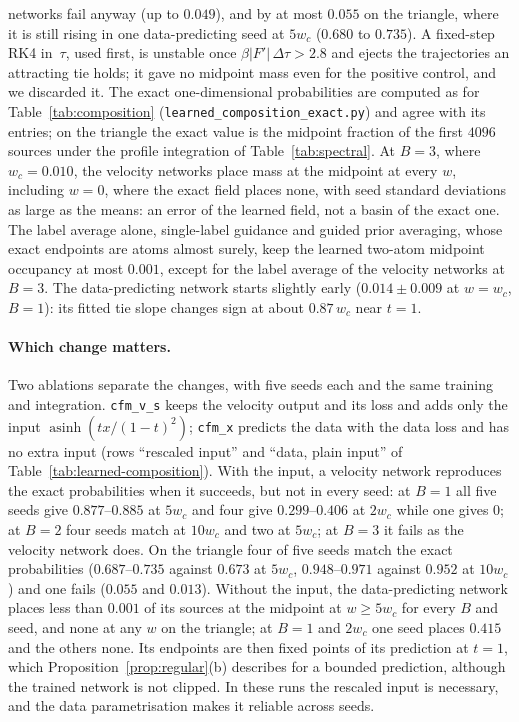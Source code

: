 \documentclass{article} %
\makeatletter
\newif\ificlr
\newcommand{\placeblock}[1]{\ificlr\@nameuse{moved@#1}\fi}
\theoremstyle{plain}
\theoremstyle{definition}
\theoremstyle{remark}
\makeatother
\begin{document}
networks fail anyway (up to $0.049$), and by at most $0.055$ on the triangle, where it is still
rising in one data-predicting seed at $5w_c$ ($0.680$ to $0.735$). A fixed-step RK4
in~$\tau$, used first, is unstable once $\beta|F'|\,\Delta\tau>2.8$ and ejects the trajectories
an attracting tie holds; it gave no midpoint mass even for the positive control, and we discarded
it. The exact one-dimensional probabilities are computed as for Table~\ref{tab:composition}
(\texttt{learned\_composition\_exact.py}) and agree with its entries; on the
triangle the exact value is the midpoint fraction of the first $4096$ sources under the profile
integration of Table~\ref{tab:spectral}. At $B=3$, where $w_c=0.010$, the velocity networks place
mass at the midpoint at every $w$, including $w=0$, where the exact field places none, with seed
standard deviations as large as the means: an error of the learned field, not a basin of the
exact one. The label average alone, single-label guidance and guided prior averaging, whose
exact endpoints are atoms almost surely, keep the learned two-atom midpoint occupancy at most
$0.001$, except for the label average of the velocity networks at $B=3$. The data-predicting network starts slightly
early ($0.014\pm0.009$ at $w=w_c$, $B=1$): its fitted tie slope changes sign at about $0.87\,w_c$
near $t=1$. \placeblock{lossrisk}

\paragraph{Which change matters.} Two ablations separate the changes, with five seeds each and
the same training and integration. \texttt{cfm\_v\_s} keeps the velocity output and its loss and
adds only the input $\operatorname{asinh}(tx/(1-t)^2)$; \texttt{cfm\_x} predicts the data with the
data loss and has no extra input (rows ``rescaled input'' and ``data, plain input'' of
Table~\ref{tab:learned-composition}). With the input, a velocity network reproduces the exact
probabilities when it succeeds, but not in every seed: at $B=1$ all five seeds give
$0.877$--$0.885$ at $5w_c$ and four give $0.299$--$0.406$ at $2w_c$ while one gives $0$; at $B=2$
four seeds match at $10w_c$ and two at $5w_c$; at $B=3$ it fails as the velocity network does.
On the triangle four of five seeds match the exact probabilities ($0.687$--$0.735$ against
$0.673$ at $5w_c$, $0.948$--$0.971$ against $0.952$ at $10w_c$) and one fails
($0.055$ and $0.013$).
Without the input, the data-predicting network places less than $0.001$ of its sources at the
midpoint at $w\ge5w_c$ for every $B$ and seed, and none at any $w$ on the triangle; at $B=1$ and $2w_c$ one seed places $0.415$ and the
others none. Its endpoints are then fixed points of its prediction at $t=1$, which
Proposition~\ref{prop:regular}(b) describes for a bounded prediction, although the trained network
is not clipped. In these runs the rescaled input is necessary, and the data parametrisation makes
it reliable across seeds.
\end{document}
